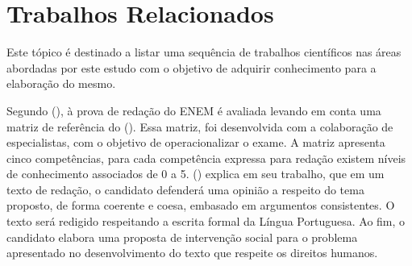 \section{Trabalhos Relacionados}
\label{section:trabalhos_relacionados}


Este tópico é destinado a listar uma sequência de trabalhos científicos nas 
áreas abordadas por este estudo com o objetivo de adquirir conhecimento para a
elaboração do mesmo.

Segundo  (\citeyear{silvio_taynan:2017}), 
à prova de redação do ENEM é avaliada levando em conta uma matriz de referência 
do \citeauthor{edital_enem:2016} (\citeyear{edital_enem:2016}). Essa matriz, 
foi desenvolvida com a colaboração de especialistas, com o objetivo de 
operacionalizar o exame. A matriz apresenta cinco competências, para cada 
competência expressa para redação existem níveis de conhecimento associados de 
0 a 5.  (\citeyear{braga:2015}) explica em seu 
trabalho, que em um texto de redação, o candidato defenderá uma opinião a 
respeito do tema proposto, de forma coerente e coesa, embasado em argumentos 
consistentes. O texto será redigido respeitando a escrita formal da Língua 
Portuguesa. Ao fim, o candidato elabora uma proposta de intervenção social para 
o problema apresentado no desenvolvimento do texto que respeite os direitos 
humanos.

